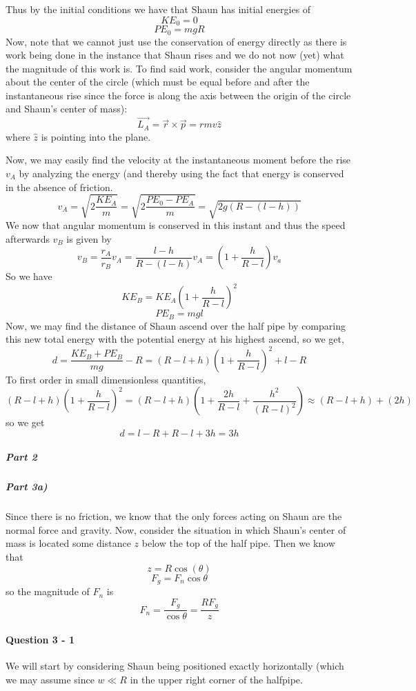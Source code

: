Thus by the initial conditions we have that Shaun has initial energies of
\[ KE_0 = 0 \]
\[ PE_0 = mgR \]
Now, note that we cannot just use the conservation of energy directly as there is work being done in the instance that Shaun rises and we do not now (yet) what the magnitude of this work is. To find said work, consider the angular momentum about the center of the circle (which must be equal before and after the instantaneous rise since the force is along the axis between the origin of the circle and Shaun's center of mass):
\[ \vec{L_A} = \vec r \times \vec p = rmv \hat{z} \]
where $\hat{z}$ is pointing into the plane. \par
Now, we may easily find the velocity at the instantaneous moment before the rise $v_A$ by analyzing the energy (and thereby using the fact that energy is conserved in the absence of friction.
\[ v_A=\sqrt{2\frac{KE_A}{m}} = \sqrt{2\frac{PE_0-PE_A}{m}} = \sqrt{2g(R-(l-h))}  \]
We now that angular momentum is conserved in this instant and thus the speed afterwards $v_B$ is given by
\[ v_B = \frac{r_A}{r_B} v_A = \frac{l-h}{R-(l-h)} v_A = \left(1+\frac{h}{R-l}\right) v_a \]
So we have
\[ KE_B = KE_A\left(1+\frac{h}{R-l}\right)^2 \]
\[ PE_B = mgl \]
Now, we may find the distance of Shaun ascend over the half pipe by comparing this new total energy with the potential energy at his highest ascend, so we get, 
\[ d=\frac{KE_B+PE_B}{mg}-R = \left(R-l+h\right)\left(1+\frac{h}{R-l}\right)^2+l-R\]
To first order in small dimensionless quantities, 
\[ \left(R-l+h\right)\left(1+\frac{h}{R-l}\right)^2 = \left(R-l+h\right) \left(1+\frac{2h}{R-l}+\frac{h^2}{(R-l)^2}\right) \approx (R-l+h)+(2h) \]
so we get
\[ d = l-R + R - l + 3h =3h \]
\subparagraph{Part 2}


\subparagraph{Part 3a)}
Since there is no friction, we know that the only forces acting on Shaun are the normal force and gravity. Now, consider the situation in which Shaun's center of mass is located some distance $z$ below the top of the half pipe. Then we know that
\[ z=R\cos(\theta) \]
\[ F_g = F_n\cos\theta \] 
so the magnitude of $F_n$ is 
\[ F_n = \frac{F_g}{\cos\theta} = \frac{RF_g}{z} \]



\paragraph{Question 3 - 1}
We will start by considering Shaun being positioned exactly horizontally (which we may assume since $w \ll R$ in the upper right corner of the halfpipe.

